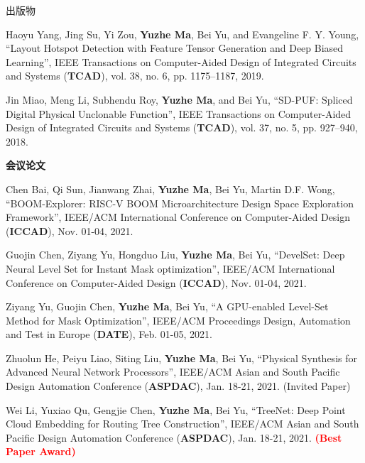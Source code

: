 \begin{rSection}{出版物}
\begin{description}[font=\normalfont]
\item[{[J2]}]{
    Haoyu Yang, Jing Su, Yi Zou, \textbf{Yuzhe Ma}, Bei Yu, and Evangeline F. Y. Young,
    ``Layout Hotspot Detection with Feature Tensor Generation and Deep Biased Learning'',
    IEEE Transactions on Computer-Aided Design of Integrated Circuits and Systems (\textbf{TCAD}), vol. 38, no. 6, pp. 1175--1187, 2019.
}

\item[{[J1]}]{
    Jin Miao, Meng Li, Subhendu Roy, \textbf{Yuzhe Ma}, and Bei Yu,
    ``SD-PUF: Spliced Digital Physical Unclonable Function'',
    IEEE Transactions on Computer-Aided Design of Integrated Circuits and Systems (\textbf{TCAD}), vol. 37, no. 5, pp. 927--940, 2018.
}
\end{description}


\textbf{会议论文}
\begin{description}[font=\normalfont]

\item [{[C24]}]{
    Chen Bai, Qi Sun, Jianwang Zhai, \textbf{Yuzhe Ma}, Bei Yu, Martin D.F. Wong,
    ``BOOM-Explorer: RISC-V BOOM Microarchitecture Design Space Exploration Framework'',
    IEEE/ACM International Conference on Computer-Aided Design (\textbf{ICCAD}), Nov. 01-04, 2021.
}


\item [{[C23]}]{
    Guojin Chen, Ziyang Yu, Hongduo Liu, \textbf{Yuzhe Ma}, Bei Yu,
    ``DevelSet: Deep Neural Level Set for Instant Mask optimization'',
    IEEE/ACM International Conference on Computer-Aided Design (\textbf{ICCAD}), Nov. 01-04, 2021.
}

\item [{[C22]}]{
    Ziyang Yu, Guojin Chen, \textbf{Yuzhe Ma}, Bei Yu,
    ``A GPU-enabled Level-Set Method for Mask Optimization'',
    IEEE/ACM Proceedings Design, Automation and Test in Europe (\textbf{DATE}), Feb. 01-05, 2021.
}

\item [{[C21]}]{
    Zhuolun He, Peiyu Liao, Siting Liu, \textbf{Yuzhe Ma}, Bei Yu,
    ``Physical Synthesis for Advanced Neural Network Processors'',
    IEEE/ACM Asian and South Pacific Design Automation Conference (\textbf{ASPDAC}), Jan. 18-21, 2021. (Invited Paper)
}

\item [{[C20]}]{
    Wei Li, Yuxiao Qu, Gengjie Chen, \textbf{Yuzhe Ma}, Bei Yu,
    ``TreeNet: Deep Point Cloud Embedding for Routing Tree Construction'',
    IEEE/ACM Asian and South Pacific Design Automation Conference (\textbf{ASPDAC}), Jan. 18-21, 2021.
    \textcolor{red}{\textbf{(Best Paper Award)}}
}


\end{description}
\end{rSection}

